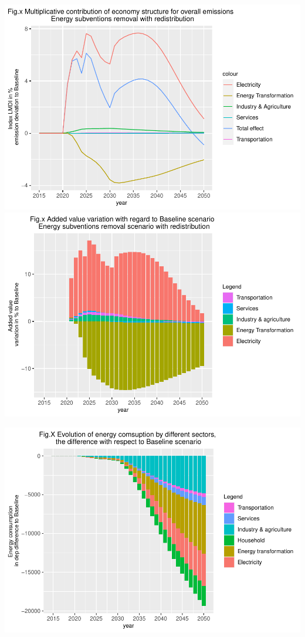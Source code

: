 \documentclass[
]{article}
\begin{document}
\includegraphics{Modele-ThreeMe-Tunisie_Sequeira_Valilou_Wang_files/figure-latex/unnamed-chunk-30-1.pdf}
\includegraphics{Modele-ThreeMe-Tunisie_Sequeira_Valilou_Wang_files/figure-latex/unnamed-chunk-30-2.pdf}

\includegraphics{Modele-ThreeMe-Tunisie_Sequeira_Valilou_Wang_files/figure-latex/unnamed-chunk-31-1.pdf}
\end{document}
